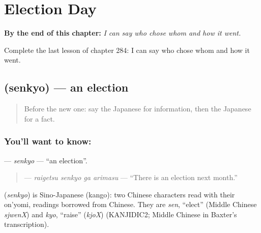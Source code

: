 
\chapter{Election Day}
\label{ch:ja-election-day}

\begin{chapteropening}
\textbf{By the end of this chapter:} \emph{I can say who chose whom and how it went.}

Complete the last lesson of chapter 284: I can say who chose whom and how it went.
\end{chapteropening}

\section[\texorpdfstring{\ja{せんきょ} (senkyo)}{せんきょ (senkyo)}]{ (senkyo) — an election}

\label{lesson:JA-C284-senkyo}



\begin{quote}
Before the new one: say the Japanese for information, then the Japanese for a fact.
\end{quote}

\subsection*{You'll want to know: }
\textbf{} — \emph{senkyo} — \textquotedblleft{}an election\textquotedblright{}.

\begin{quote}
\textbf{  } — \emph{raigetsu senkyo ga arimasu} — \textquotedblleft{}There is an election next month.\textquotedblright{}
\end{quote}

\begin{cousinweb}
\textbf{} (\emph{senkyo}) is Sino-Japanese (kango): two Chinese characters read with their on'yomi, readings borrowed from Chinese. They are \emph{sen}, \textquotedblleft{}elect\textquotedblright{} (Middle Chinese \emph{sjwenX}) and \emph{kyo}, \textquotedblleft{}raise\textquotedblright{} (\emph{kjoX}) (KANJIDIC2; Middle Chinese in Baxter's transcription).
\end{cousinweb}

